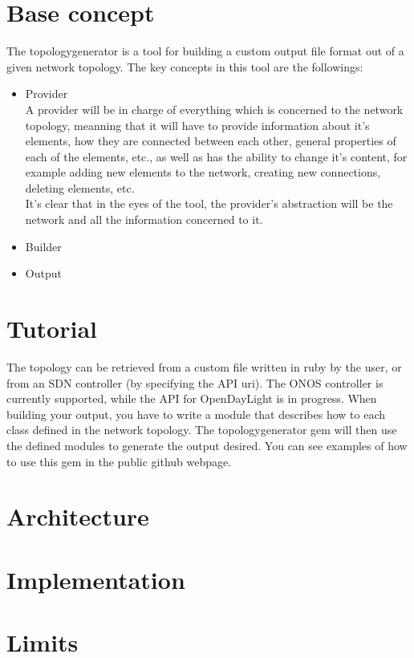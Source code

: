 \section{Base concept}

The topologygenerator is a tool for building a custom output file format out of a given network topology. The key concepts in this tool are the followings:
\begin{itemize}
\item Provider \\
A provider will be in charge of everything which is concerned to the network topology, meanning that it will have to provide information about it's elements, how they are connected between each other, general properties of each of the elements, etc., as well as has the ability to change it's content, for example adding new elements to the network, creating new connections, deleting elements, etc.\\
It's clear that in the eyes of the tool, the provider's abstraction will be the network and all the information concerned to it.

\item Builder \\


\item Output \\

\end{itemize}

\section{Tutorial}

The topology can be retrieved from a custom file written in ruby by the user, or from an SDN controller (by specifying the API uri). The ONOS controller is currently supported, while the API for OpenDayLight is in progress. When building your output, you have to write a module that describes how to each class defined in the network topology. The topologygenerator gem will then use the defined modules to generate the output desired. You can see examples of how to use this gem in the public github webpage.

\section{Architecture}

\section{Implementation}

\section{Limits}